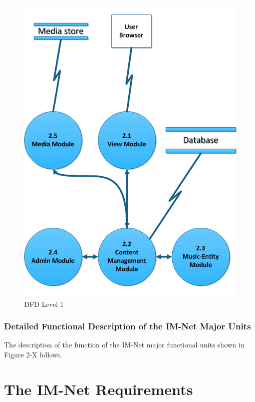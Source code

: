 \documentclass[letterpaper]{article}
\begin{document}
\begin{figure}[h!]
\centering
\includegraphics{DFD_level_1.png}
\caption{DFD Level 1}
\label{fig:DFD_level_1}
\end{figure}
\eject
 
\subsubsection{\textcolor{subsubsection}{Detailed Functional Description of the IM-Net Major Units}}

The description of the function of the IM-Net major functional units shown in Figure 2-X follows.

\eject

\section{\textcolor{section}{The IM-Net Requirements}}
 
\end{document}
